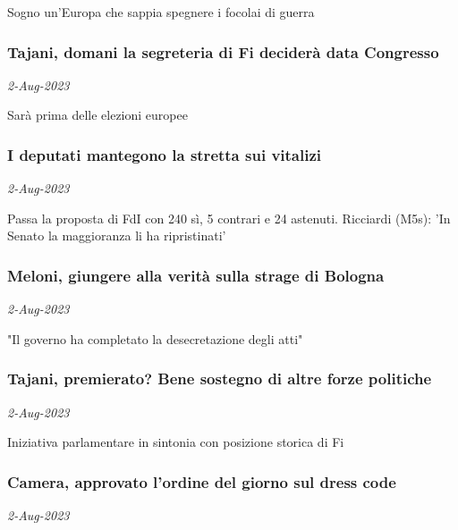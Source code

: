 Sogno un'Europa che sappia spegnere i focolai di guerra
\subsubsection{Tajani, domani la segreteria di Fi decider\`{a} data Congresso \href{https://www.ansa.it/sito/notizie/politica/2023/08/02/tajani-domani-la-segreteria-di-fi-decidera-data-congresso_f2408085-768f-4a4c-815f-609a405a97c4.html}{}}
\textit{2-Aug-2023}

Sar\`{a} prima delle elezioni europee
\subsubsection{I deputati mantegono la stretta sui vitalizi \href{https://www.ansa.it/sito/notizie/politica/2023/08/02/i-deputati-mantegono-la-stretta-sui-vitalizi-_3b2bc935-a875-4019-b439-3adeee9b79f0.html}{}}
\textit{2-Aug-2023}

Passa la proposta di FdI con 240 s\`{i}, 5 contrari e 24 astenuti. Ricciardi (M5s): 'In Senato la maggioranza li ha ripristinati'
\subsubsection{Meloni, giungere alla verit\`{a} sulla strage di Bologna \href{https://www.ansa.it/sito/notizie/politica/2023/08/02/meloni-giungere-alla-verita-sulla-strage-di-bologna_f2885b76-6f79-44df-9758-1d0202c29540.html}{}}
\textit{2-Aug-2023}

"Il governo ha completato la desecretazione degli atti"
\subsubsection{Tajani, premierato? Bene sostegno di altre forze politiche \href{https://www.ansa.it/sito/notizie/politica/2023/08/02/tajani-premierato-bene-sostegno-di-altre-forze-politiche_f3f3c885-39b7-4ba4-8ce3-b63fc5c62edf.html}{}}
\textit{2-Aug-2023}

Iniziativa parlamentare in sintonia con posizione storica di Fi
\subsubsection{Camera, approvato l'ordine del giorno sul dress code \href{https://www.ansa.it/sito/notizie/politica/2023/08/02/camera-approvato-lordine-del-giorno-sul-dress-code_739c9bd5-25c8-4f7e-8c4d-a16a31aed98d.html}{}}
\textit{2-Aug-2023}


